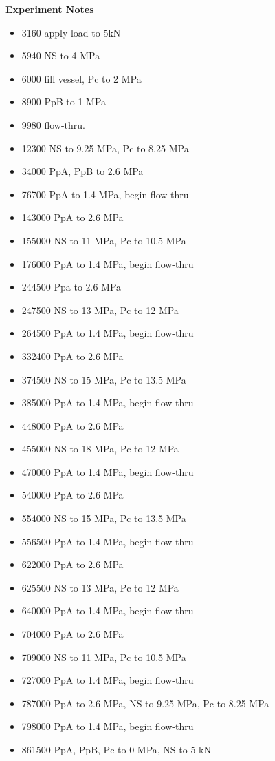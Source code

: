\documentclass[letterpaper, 10pt]{article}
\begin{document}
\newpage 
 \textbf{Experiment Notes}
 \medskip
 {\small \begin{itemize}[label=\#]
 \setlength\itemsep{0.25em}
 	 \item 3160 apply load to 5kN
 	 \item 5940 NS to 4 MPa
 	 \item 6000 fill vessel, Pc to 2 MPa
 	 \item 8900 PpB to 1 MPa
 	 \item 9980 flow-thru. 
 	 \item 12300 NS to 9.25 MPa, Pc to 8.25 MPa
 	 \item 34000 PpA, PpB to 2.6 MPa
 	 \item 76700 PpA to 1.4 MPa, begin flow-thru
 	 \item 143000 PpA to 2.6 MPa
 	 \item 155000 NS to 11 MPa, Pc to 10.5 MPa
 	 \item 176000 PpA to 1.4 MPa, begin flow-thru
 	 \item 244500 Ppa to 2.6 MPa
 	 \item 247500 NS to 13 MPa, Pc to 12 MPa
 	 \item 264500 PpA to 1.4 MPa, begin flow-thru
 	 \item 332400 PpA to 2.6 MPa
 	 \item 374500 NS to 15 MPa, Pc to 13.5 MPa
 	 \item 385000 PpA to 1.4 MPa, begin flow-thru
 	 \item 448000 PpA to 2.6 MPa
 	 \item 455000 NS to 18 MPa, Pc to 12 MPa
 	 \item 470000 PpA to 1.4 MPa, begin flow-thru
 	 \item 540000 PpA to 2.6 MPa
 	 \item 554000 NS to 15 MPa, Pc to 13.5 MPa
 	 \item 556500 PpA to 1.4 MPa, begin flow-thru
 	 \item 622000 PpA to 2.6 MPa
 	 \item 625500 NS to 13 MPa, Pc to 12 MPa
 	 \item 640000 PpA to 1.4 MPa, begin flow-thru
 	 \item 704000 PpA to 2.6 MPa
 	 \item 709000 NS to 11 MPa, Pc to 10.5 MPa
 	 \item 727000 PpA to 1.4 MPa, begin flow-thru
 	 \item 787000 PpA to 2.6 MPa, NS to 9.25 MPa, Pc to 8.25 MPa
 	 \item 798000 PpA to 1.4 MPa, begin flow-thru
 	 \item 861500 PpA, PpB, Pc to 0 MPa, NS to 5 kN
 \end{itemize}} 

 
\end{document}
